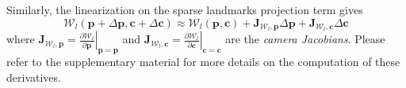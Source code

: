 Similarly, the linearization on the sparse landmarks projection term gives
%
\begin{equation}
\mathcal{W}_l(\mathbf{p}+\Delta\mathbf{p},\mathbf{c}+\Delta\mathbf{c})\approx\mathcal{W}_l(\mathbf{p},\mathbf{c}) + \mathbf{J}_{\mathcal{W}_l,\mathbf{p}}\Delta\mathbf{p} + \mathbf{J}_{\mathcal{W}_l,\mathbf{c}}\Delta\mathbf{c}
\label{equ:landmarks_linearization}
\end{equation}
%
where
$\mathbf{J}_{\mathcal{W}_l,\mathbf{p}}=\left.\frac{\partial\mathcal{W}_l}{\partial\mathbf{p}}\right|_{\mathbf{p}=\mathbf{p}}$
and
$\mathbf{J}_{\mathcal{W}_l,\mathbf{c}}=\left.\frac{\partial\mathcal{W}_l}{\partial\mathbf{c}}\right|_{\mathbf{c}=\mathbf{c}}$
are the \emph{camera Jacobians}. Please refer to the supplementary material for more details on the computation of these derivatives.


%
